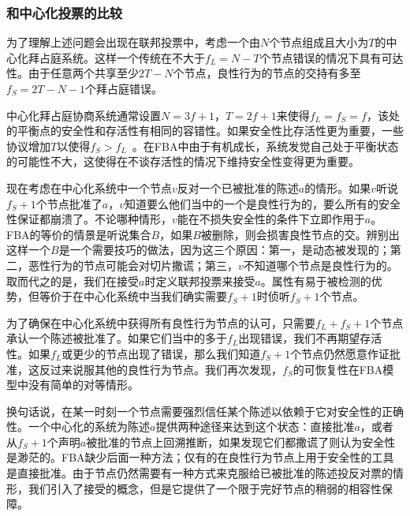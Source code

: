 \subsubsection{和中心化投票的比较}

为了理解上述问题会出现在联邦投票中，考虑一个由$N$个节点组成且{\quorum}大小为$T$的中心化拜占庭系统。这样一个传统在不大于$f_L=N-T$个节点错误的情况下具有{\quorum}可达性。由于任意两个{\quorum}共享至少$2T-N$个节点，良性行为的节点的{\quorum}交持有多至$f_S=2T-N-1$个拜占庭错误。

中心化拜占庭协商系统通常设置$N=3f+1$，$T=2f+1$来使得$f_L=f_S=f$，该处的平衡点的安全性和存活性有相同的容错性。如果安全性比存活性更为重要，一些协议增加$T$以使得$f_S>f_L$~\cite{Li:2007:BOF:1973430.1973440}。在FBA中由于{\quorum}有机成长，系统发觉自己处于平衡状态的可能性不大，这使得在不谈存活性的情况下维持安全性变得更为重要。

现在考虑在中心化系统中一个节点$v$反对一个已被批准的陈述$a$的情形。如果$v$听说$f_S+1$个节点批准了$a$，$v$知道要么他们当中的一个是良性行为的，要么所有的安全性保证都崩溃了。不论哪种情形，$v$能在不损失安全性的条件下立即作用于$a$。FBA的等价的情景是听说集合$B$，如果$B$被删除，则会损害良性节点的{\quorum}交。辨别出这样一个$B$是一个需要技巧的做法，因为这三个原因：第一，{\quorum}是动态被发现的；第二，恶性行为的节点可能会对切片撒谎；第三，$v$不知道哪个节点是良性行为的。取而代之的是，我们在{\vblock}接受$a$时定义联邦投票来接受$a$。{\vblock}属性有易于被检测的优势，但等价于在中心化系统中当我们确实需要$f_S+1$时侦听$f_S+1$个节点。


为了确保在中心化系统中获得所有良性行为节点的认可，只需要$f_L+f_S+1$个节点承认一个陈述被批准了。如果它们当中的多于$f_L$出现错误，我们不再期望存活性。如果$f_L$或更少的节点出现了错误，那么我们知道$f_S+1$个节点仍然愿意作证批准，这反过来说服其他的良性行为节点。我们再次发现，$f_S$的可恢复性在FBA模型中没有简单的对等情形。

换句话说，在某一时刻一个节点需要强烈信任某个陈述以依赖于它对安全性的正确性。一个中心化的系统为陈述$a$提供两种途径来达到这个状态：直接批准$a$，或者从$f_S+1$个声明$a$被批准的节点上回溯推断，如果发现它们都撒谎了则认为安全性是渺茫的。FBA缺少后面一种方法；仅有的在良性行为节点上用于安全性的工具是直接批准。由于节点仍然需要有一种方式来克服给已被批准的陈述投反对票的情形，我们引入了接受的概念，但是它提供了一个限于完好节点的稍弱的相容性保障。
